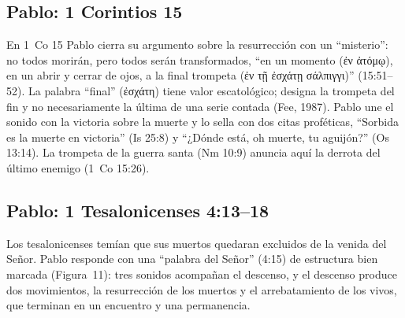 \documentclass[11pt,letterpaper]{article}
\newcommand{\grc}[1]{\foreignlanguage{ancientgreek}{#1}}
\begin{document}
\subsection{Pablo: 1 Corintios 15}
En 1~Co 15 Pablo cierra su argumento sobre la resurrección con un ``misterio'': no todos morirán, pero todos serán transformados, ``en un momento (\grc{ἐν ἀτόμῳ}), en un abrir y cerrar de ojos, a la final trompeta (\grc{ἐν τῇ ἐσχάτῃ σάλπιγγι})'' (15:51--52). La palabra ``final'' (\grc{ἐσχάτη}) tiene valor escatológico; designa la trompeta del fin y no necesariamente la última de una serie contada (Fee, 1987). Pablo une el sonido con la victoria sobre la muerte y lo sella con dos citas proféticas, ``Sorbida es la muerte en victoria'' (Is 25:8) y ``¿Dónde está, oh muerte, tu aguijón?'' (Os 13:14). La trompeta de la guerra santa (Nm 10:9) anuncia aquí la derrota del último enemigo (1~Co 15:26).

\subsection{Pablo: 1 Tesalonicenses 4:13--18}
Los tesalonicenses temían que sus muertos quedaran excluidos de la venida del Señor. Pablo responde con una ``palabra del Señor'' (4:15) de estructura bien marcada (Figura~11): tres sonidos acompañan el descenso, y el descenso produce dos movimientos, la resurrección de los muertos y el arrebatamiento de los vivos, que terminan en un encuentro y una permanencia.
\end{document}
